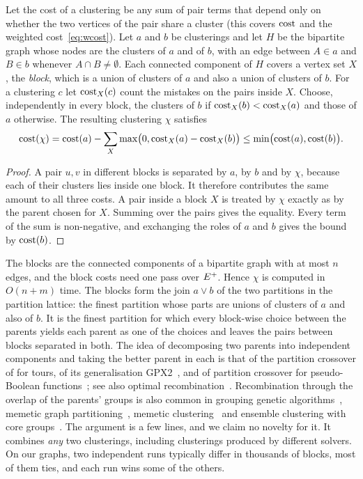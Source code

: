 \begin{theorem}\label{thm:px}
Let the cost of a clustering be any sum of pair terms that depend only on
whether the two vertices of the pair share a cluster (this covers $\mathrm{cost}$ and
the weighted cost~\eqref{eq:wcost}).  Let $a$ and $b$ be clusterings and let
$H$ be the bipartite graph whose nodes
are the clusters of $a$ and of $b$, with an edge between $A\in a$ and $B\in b$
whenever $A\cap B\ne\emptyset$.  Each connected component of $H$ covers a
vertex set $X$, the \emph{block}, which is a union of clusters of $a$ and also
a union of clusters of $b$.  For a clustering $c$ let $\mathrm{cost}_X(c)$ count the
mistakes on the pairs inside $X$.  Choose, independently in every block, the
clusters of $b$ if $\mathrm{cost}_X(b)<\mathrm{cost}_X(a)$ and those of $a$ otherwise.  The
resulting clustering $\chi$ satisfies
\[
\mathrm{cost}(\chi)=\mathrm{cost}(a)-\sum_X\max\bigl(0,\mathrm{cost}_X(a)-\mathrm{cost}_X(b)\bigr)
\le\min\bigl(\mathrm{cost}(a),\mathrm{cost}(b)\bigr).
\]
\end{theorem}
\begin{proof}
A pair $u,v$ in different blocks is separated by $a$, by $b$ and by $\chi$,
because each of their clusters lies inside one block.  It therefore
contributes the same amount to all three costs.  A pair inside a block $X$ is
treated by $\chi$ exactly as by the parent chosen for $X$.  Summing over the
pairs gives the equality.  Every term of the sum is non-negative, and
exchanging the roles of $a$ and $b$ gives the bound by $\mathrm{cost}(b)$.
\end{proof}

The blocks are the connected components of a bipartite graph with at most $n$
edges, and the block costs need one pass over $E^{+}$.  Hence $\chi$ is computed in
$O(n+m)$ time.  The blocks form the join $a\vee b$ of the two partitions in the partition
lattice: the finest partition whose parts are unions of clusters of $a$ and
also of $b$.  It is the finest partition for which every block-wise choice
between the parents yields each parent as one of the choices and leaves the
pairs between blocks separated in both.  The idea of decomposing two parents
into independent components and taking the better parent in each is that of
the partition crossover of \citet{WhitleyHH09gpx,WhitleyHH10hybrid} for tours,
of its generalisation GPX2~\citep{TinosWO20gpx2}, and of partition crossover
for pseudo-Boolean functions~\citep{TinosWC15px}; see also optimal
recombination~\citep{EremeevK14orp}.  Recombination through the overlap of the
parents' groups is also common in grouping genetic
algorithms~\citep{Falkenauer98grouping,GalinierH99coloring}, memetic graph
partitioning~\citep{SandersS12kaffpae,BenlicH11multilevel}, memetic
clustering~\citep{BiedermannHSS18memetic} and ensemble clustering with core
groups~\citep{OvelgonneG13ensemble}.  The argument is a few lines, and we
claim no novelty for it.  It combines \emph{any} two
clusterings, including clusterings produced by different solvers.  On our graphs, two independent runs typically differ in thousands of
blocks, most of them ties, and each run wins some of the others.

